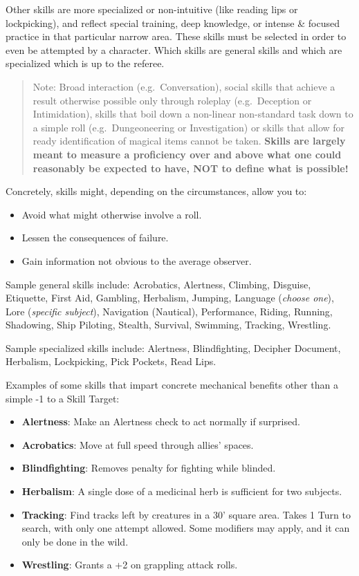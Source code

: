 \documentclass{book}
\providecommand{\tightlist}{%
\setlength{\itemsep}{0pt}\setlength{\parskip}{0pt}}
\begin{document}
Other skills are more specialized or non-intuitive (like reading lips or
lockpicking), and reflect special training, deep knowledge, or intense
\& focused practice in that particular narrow area. These skills must be
selected in order to even be attempted by a character. Which skills are
general skills and which are specialized which is up to the referee.

\begin{quote}
Note: Broad interaction (e.g.~Conversation), social skills that achieve
a result otherwise possible only through roleplay (e.g.~Deception or
Intimidation), skills that boil down a non-linear non-standard task down
to a simple roll (e.g.~Dungeoneering or Investigation) or skills that
allow for ready identification of magical items cannot be taken.
\textbf{Skills are largely meant to measure a proficiency over and above
what one could reasonably be expected to have, NOT to define what is
possible!}
\end{quote}

\newpage

Concretely, skills might, depending on the circumstances, allow you to:

\begin{itemize}
\tightlist
\item
  Avoid what might otherwise involve a roll.
\item
  Lessen the consequences of failure.
\item
  Gain information not obvious to the average observer.
\end{itemize}

Sample general skills include: Acrobatics, Alertness, Climbing,
Disguise, Etiquette, First Aid, Gambling, Herbalism, Jumping, Language
(\emph{choose one}), Lore (\emph{specific subject}), Navigation
(Nautical), Performance, Riding, Running, Shadowing, Ship Piloting,
Stealth, Survival, Swimming, Tracking, Wrestling.

Sample specialized skills include: Alertness, Blindfighting, Decipher
Document, Herbalism, Lockpicking, Pick Pockets, Read Lips.

Examples of some skills that impart concrete mechanical benefits other
than a simple -1 to a Skill Target:

\begin{itemize}
\tightlist
\item
  \textbf{Alertness}: Make an Alertness check to act normally if
  surprised.
\item
  \textbf{Acrobatics}: Move at full speed through allies' spaces.
\item
  \textbf{Blindfighting}: Removes penalty for fighting while blinded.
\item
  \textbf{Herbalism}: A single dose of a medicinal herb is sufficient
  for two subjects.
\item
  \textbf{Tracking}: Find tracks left by creatures in a 30' square area.
  Takes 1 Turn to search, with only one attempt allowed. Some modifiers
  may apply, and it can only be done in the wild.
\item
  \textbf{Wrestling}: Grants a +2 on grappling attack rolls.
\end{itemize}
\end{document}
